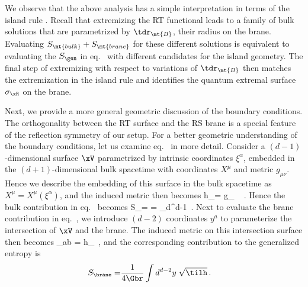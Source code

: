 \begin{figure}[h]
	\def\svgwidth{\linewidth}
\end{figure}

We observe that the above analysis has a simple interpretation in terms of the island rule . Recall that extremizing the RT functional  leads to a family of bulk solutions that are parametrized by $\tdr_\mt{B}$, their radius on the brane. Evaluating $S_\mt{bulk}+S_\mt{brane}$ for these different solutions is equivalent to evaluating the $S_\gen$ in eq.~ with different candidates for the island geometry. The final step of extremizing with respect to variations of $\tdr_\mt{B}$ then matches the extremization in the island rule and identifies the quantum extremal surface $\sigma_\xR$ on the brane.



Next, we provide a more general geometric discussion of the boundary conditions.
The orthogonality between the RT surface and the RS brane is a special feature of the reflection symmetry of our setup. For a better geometric understanding of the boundary conditions, let us examine eq.~ in more detail. Consider a $(d-1)$-dimensional surface $\xV$ parametrized by intrinsic coordinates $\xi^\alpha$, embedded in the $(d+1)$-dimensional bulk spacetime with coordinates $X^\mu$ and metric $g_{\mu\nu}$. Hence we describe the embedding of this surface in the bulk spacetime as $X^\mu = X^\mu(\xi^\alpha)$, and the induced metric then becomes
\beq
h_{\alpha\beta}= g_{\mu\nu}\,
  \,
  \,.
\label{badnote}
\eeq
Hence the bulk contribution in eq.~ becomes
\beq
  S_=
  = \int_\xV d^{d-1}\xi\; \,.
\label{eq:badNotation}
\eeq
Next to evaluate the brane contribution in eq.~, we introduce $(d-2)$ coordinates $y^a$ to parameterize the intersection of $\xV$ and the brane. The induced metric on this intersection surface then becomes
\beq\label{badnote2}
  \tilh_{ab}
  = h_{\alpha\beta}
  \,,
\eeq
and the corresponding contribution to the generalized entropy is
\begin{align}
  S_\brane
  =& \frac{1}{4\Gbr}\int d^{d-2}y\; \sqrt{\tilh}\,.
  \label{eq:facundo}
\end{align}

